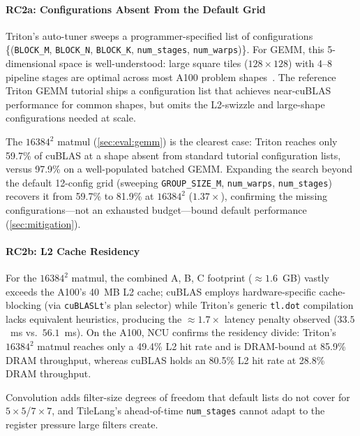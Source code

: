 \label{sec:analysis:autotune}
\paragraph{RC2a: Configurations Absent From the Default Grid}
Triton's auto-tuner sweeps a programmer-specified list of configurations
\{(\texttt{BLOCK\_M}, \texttt{BLOCK\_N}, \texttt{BLOCK\_K}, \texttt{num\_stages}, \texttt{num\_warps})\}. For GEMM, this 5-dimensional space is well-understood:
large square tiles ($128 \times 128$) with 4--8 pipeline stages
are optimal across most A100 problem shapes~\cite{tillet2019triton}.
The reference Triton GEMM tutorial ships a configuration list that achieves
near-cuBLAS performance for common shapes, but omits the L2-swizzle and large-shape configurations needed at scale.

The $16384^2$ matmul (\cref{sec:eval:gemm}) is the clearest case: Triton reaches only 59.7\% of cuBLAS at a shape absent from standard tutorial configuration lists, versus 97.9\% on a well-populated batched GEMM.
Expanding the search beyond the default 12-config grid (sweeping \texttt{GROUP\_SIZE\_M}, \texttt{num\_warps}, \texttt{num\_stages}) recovers it from 59.7\% to 81.9\% at $16384^2$ ($1.37\times$), confirming the missing configurations---not an exhausted budget---bound default performance (\cref{sec:mitigation}).

\label{sec:analysis:l2cache}
\paragraph{RC2b: L2 Cache Residency}
For the $16384^2$ matmul, the combined A, B, C footprint (${\approx}1.6$~GB) vastly exceeds the A100's 40~MB L2 cache; cuBLAS employs hardware-specific cache-blocking (via \texttt{cuBLASLt}'s plan selector) while Triton's generic \texttt{tl.dot} compilation lacks equivalent heuristics, producing the ${\approx}1.7\times$ latency penalty observed ($33.5$~ms vs.\ $56.1$~ms).
On the A100, NCU confirms the residency divide: Triton's $16384^2$ matmul reaches only a 49.4\% L2 hit rate and is DRAM-bound at 85.9\% DRAM throughput, whereas cuBLAS holds an 80.5\% L2 hit rate at 28.8\% DRAM throughput.

Convolution adds filter-size degrees of freedom that default lists do not cover for $5\times5$/$7\times7$, and TileLang's ahead-of-time \texttt{num\_stages} cannot adapt to the register pressure large filters create.

\label{sec:analysis:regpressure}
